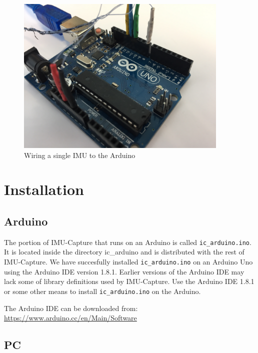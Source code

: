 \documentclass[11pt,letterpaper,article,oneside]{memoir}
\newcommand{\name}{IMU-Capture}
\newcommand{\arduinoFilename}{\texttt{ic\_arduino.ino}}
\newcommand{\arduinoDirectory}{ic\_arduino}
\begin{document}
\begin{figure}[]
    \begin{center}
        \includegraphics[height=3in]{wiring}
    \end{center}
    \label{fig:wiring}
    \caption{Wiring a single IMU to the Arduino}
\end{figure}




\chapter{Installation}

\section{Arduino}
\label{sec:installarduinocode}
The portion of \name{} that runs on an Arduino is called \arduinoFilename{}. It
is located inside the directory \arduinoDirectory{} and is distributed with the
rest of \name{}.  We have succesfully installed \arduinoFilename{} on an Arduino
Uno using the Arduino IDE version 1.8.1. Earlier versions of the Arduino IDE may
lack some of library definitions used by \name{}. Use the Arduino IDE 1.8.1 or
some other means to install \arduinoFilename{} on the Arduino.

The Arduino IDE can be downloaded from:
\url{https://www.arduino.cc/en/Main/Software}


\section{PC}
\label{sec:installPc}
\end{document}
